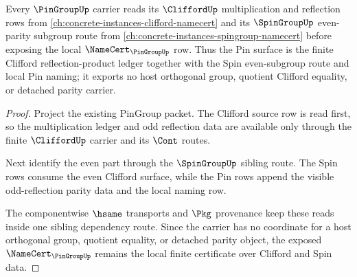 \begin{theorem}
\label{thm:pingroup-sibling-dependency-route}
Every $\PinGroupUp$ carrier reads its $\CliffordUp$ multiplication and reflection rows from \autoref{ch:concrete-instances-clifford-namecert} and its $\SpinGroupUp$ even-parity subgroup route from \autoref{ch:concrete-instances-spingroup-namecert} before exposing the local $\NameCert_{\PinGroupUp}$ row. Thus the Pin surface is the finite Clifford reflection-product ledger together with the Spin even-subgroup route and local Pin naming; it exports no host orthogonal group, quotient Clifford equality, or detached parity carrier.
\end{theorem}

\begin{proof}
Project the existing PinGroup packet. The Clifford source row is read first, so the multiplication ledger and odd reflection data are available only through the finite $\CliffordUp$ carrier and its $\Cont$ routes.

Next identify the even part through the $\SpinGroupUp$ sibling route. The Spin rows consume the even Clifford surface, while the Pin rows append the visible odd-reflection parity data and the local naming row.

The componentwise $\hsame$ transports and $\Pkg$ provenance keep these reads inside one sibling dependency route. Since the carrier has no coordinate for a host orthogonal group, quotient equality, or detached parity object, the exposed $\NameCert_{\PinGroupUp}$ remains the local finite certificate over Clifford and Spin data.
\end{proof}
